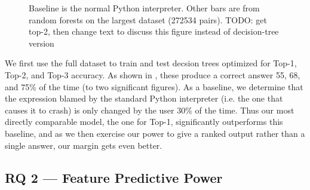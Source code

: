 \documentclass[conference]{IEEEtran}
\begin{document}
\begin{figure}
\caption{Baseline is the normal Python interpreter. Other bars are from random
forests on the largest dataset (272534 pairs). TODO: get top-2, then change text
to discuss this figure instead of decision-tree version}
\label{fig-full-dataset-acc-random-forest}
\end{figure}

We first use the full dataset to train and test decsion trees optimized for
Top-1, Top-2, and Top-3 accuracy. As shown in ,
these produce a correct answer 55, 68, and
75\% of the time (to two significant figures). As a baseline, we determine that
the expression blamed by the standard Python interpreter (i.e. the one that
causes it to crash) is only changed by the user 30\% of the time. Thus our
most directly comparable model, the one for Top-1, significantly outperforms
this baseline, and as we then exercise our power to give a ranked output rather
than a single answer, our margin gets even better.


\subsection{RQ 2 --- Feature Predictive Power}
\end{document}
